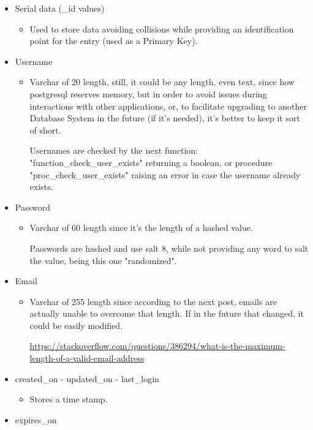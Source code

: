 \begin{flushleft}
    \begin{itemize}
        \item Serial data (\_id values)
        \begin{itemize}
            \item Used to store data avoiding collisions while providing an identification point for the entry (used as a Primary Key).
        \end{itemize}
        \item Username
            \begin{itemize}
                \item Varchar of 20 length, still, it could be any length, even text, since how postgresql reserves memory,
                but in order to avoid issues during interactions with other applications, or, to facilitate upgrading to
                another Database System in the future (if it's needed), it's better to keep it sort of short.
                \begin{flushleft}
                    Usernames are checked by the next function: "function\_check\_user\_exists" returning a boolean, or
                    procedure "proc\_check\_user\_exists" raising an error in case the username already exists.
                \end{flushleft}
            \end{itemize}
        \item Password
        \begin{itemize}
            \item Varchar of 60 length since it's the length of a hashed value.
            \begin{flushleft}
                Passwords are hashed and use salt 8, while not providing any word to salt the value, being this one "randomized".
            \end{flushleft}
        \end{itemize}
        \item Email
        \begin{itemize}
            \item Varchar of 255 length since according to the next post, emails are actually unable to overcome that length.
            If in the future that changed, it could be easily modified.
            \begin{flushleft}
                \url{https://stackoverflow.com/questions/386294/what-is-the-maximum-length-of-a-valid-email-address}
            \end{flushleft}
        \end{itemize}
        \item created\_on - updated\_on - last\_login
        \begin{itemize}
            \item Stores a time stamp.
        \end{itemize}
        \item expires\_on
        \begin{itemize}


\end{itemize}
\end{itemize}
\end{flushleft}
